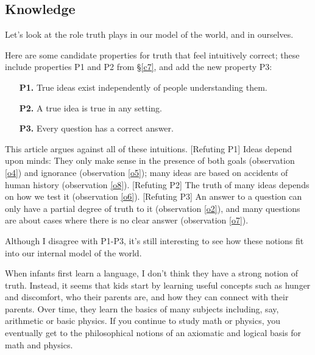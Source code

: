 \documentclass[11pt, oneside]{article}
\begin{document}
\subsection{Knowledge}


Let's look at the role truth plays in our model of the world, and in
ourselves.

Here are some candidate properties for truth that feel intuitively correct;
these include properties P1 and P2 from \S\ref{c7}, and
add the new property P3:
\begin{itemize}
    \item[{\bf P1.}] True ideas exist independently of people understanding
        them.
    \item[{\bf P2.}] A true idea is true in any setting.
    \item[{\bf P3.}] Every question has a correct answer.
\end{itemize}
This article argues against all of these intuitions.
[Refuting P1] Ideas depend upon minds: They only make sense in the presence of
both goals (observation \ref{o4}) and ignorance (observation \ref{o5}); many
ideas are based on accidents of human history (observation \ref{o8}).
[Refuting P2] The
truth of many ideas depends on how we test it (observation \ref{o6}).
[Refuting P3] An answer to a question can only have a partial degree of truth to
it
(observation \ref{o2}), and many questions are about cases where
there is no clear answer (observation \ref{o7}).

Although I disagree with P1-P3, it's still interesting to see how these notions
fit into our internal model of the world.

When infants first learn a language,
I don't think they have a strong
notion of truth.
Instead, it seems that kids start by learning
useful concepts such as
hunger and discomfort, who their parents are, and how they can connect with
their parents.
Over time, they learn the basics of many subjects including, say,
arithmetic or basic physics.
If you continue to study math or physics, you eventually get to the
philosophical notions of an axiomatic and logical basis for math and physics.
\end{document}
